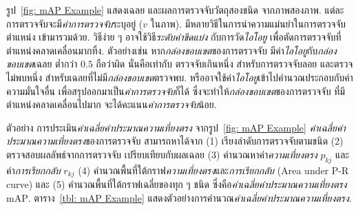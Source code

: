 รูป~\ref{fig: mAP Example}
แสดงเฉลย และผลการตรวจจับวัตถุสองชนิด จากภาพสองภาพ.
แต่ละการตรวจจับจะมี\textit{ค่าการตรวจจับ}ระบุอยู่ ($v$ ในภาพ).
มีหลายวิธีในการนำความแม่นยำในการตรวจจับตำแหน่ง เข้ามารวมด้วย.
วิธีง่าย ๆ อาจใช้วิธี\textit{ระดับค่าขีดแบ่ง} กับการวัด\textit{ไอโอยู} เพื่อตัดการตรวจจับที่ตำแหน่งคลาดเคลื่อนมากทิ้ง.
ตัวอย่างเช่น
หาก\textit{กล่องขอบเขต}ของการตรวจจับ มีค่า\textit{ไอโอยู}กับ\textit{กล่องขอบเขต}เฉลย
ต่ำกว่า $0.5$ ถือว่าผิด
นั่นคือเท่ากับ ตรวจจับเกินหนึ่ง 
สำหรับการตรวจจับลอย 
และตรวจไม่พบหนึ่ง 
สำหรับเฉลยที่ไม่มี\textit{กล่องขอบเขต}ตรวจพบ.
หรืออาจใช้ค่า\textit{ไอโอยู}เข้าไปคำนวณประกอบกับค่าความมั่นใจอื่น เพื่อสรุปออกมาเป็น\textit{ค่าการตรวจจับ}ก็ได้
ซึ่งจะทำให้\textit{กล่องขอบเขต}ของการตรวจจับ 
ที่มีตำแหน่งคลาดเคลื่อนไปมาก จะได้คะแนน\textit{ค่าการตรวจจับ}น้อย.

ตัวอย่าง การประเมิน\textit{ค่าเฉลี่ยค่าประมาณความเที่ยงตรง}
จากรูป~\ref{fig: mAP Example} \textit{ค่าเฉลี่ยค่าประมาณความเที่ยงตรง}ของการตรวจจับ สามารถหาได้จาก
(1) เรียงลำดับการตรวจจับตามชนิด
(2) ตรวจสอบผลลัพธ์จากการตรวจจับ เปรียบเทียบกับผลเฉลย
(3) คำนวณหาค่า\textit{ความเที่ยงตรง} $p_{kj}$ และค่า\textit{การเรียกกลับ} $r_{kj}$
(4) คำนวณพื้นที่ใต้กราฟ\textit{ความเที่ยงตรง}และ\textit{การเรียกกลับ} (Area under P-R curve)
และ (5) คำนวณพื้นที่ใต้กราฟเฉลี่ยของทุก ๆ ชนิด ซึ่งคือ\textit{ค่าเฉลี่ยค่าประมาณความเที่ยงตรง} $\mathrm{mAP}$.
ตาราง~\ref{tbl: mAP Example} แสดงตัวอย่างการคำนวณ\textit{ค่าเฉลี่ยค่าประมาณความเที่ยงตรง}.

